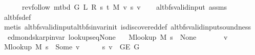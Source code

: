 \begin{isabellebody}
\ \ \ \ \ \ {\isacharparenleft}{\kern0pt}rev{\isacharunderscore}{\kern0pt}follow\ {\isacharparenleft}{\kern0pt}m{\isacharunderscore}{\kern0pt}tbd\ G\ L\ R\ s\ t\ M{\isacharparenright}{\kern0pt}\ v{\isacharparenright}{\kern0pt}\ s\ v{\isachardoublequoteclose}\isanewline
%
\isadelimproof
\ \ %
\endisadelimproof
%
\isatagproof
{}\isamarkupfalse%
\ alt{\isacharunderscore}{\kern0pt}bfs{\isacharunderscore}{\kern0pt}valid{\isacharunderscore}{\kern0pt}input\ assms\isanewline
\ \ \isamarkupfalse%
\ alt{\isacharunderscore}{\kern0pt}bfs{\isacharunderscore}{\kern0pt}def\isanewline
\ \ \isamarkupfalse%
\ {\isacharparenleft}{\kern0pt}metis\ alt{\isacharunderscore}{\kern0pt}bfs{\isacharunderscore}{\kern0pt}valid{\isacharunderscore}{\kern0pt}input{\isachardot}{\kern0pt}alt{\isacharunderscore}{\kern0pt}bfs{\isacharunderscore}{\kern0pt}invar{\isacharunderscore}{\kern0pt}init\ is{\isacharunderscore}{\kern0pt}discovered{\isacharunderscore}{\kern0pt}def\ alt{\isacharunderscore}{\kern0pt}bfs{\isacharunderscore}{\kern0pt}valid{\isacharunderscore}{\kern0pt}input{\isachardot}{\kern0pt}soundness{\isacharparenright}{\kern0pt}%
\endisatagproof
{\isafoldproof}%
%
\isadelimproof
\isanewline
%
\endisadelimproof
%
\isadeliminvisible
\isanewline
%
\endisadeliminvisible
%
\isataginvisible
{}\isamarkupfalse%
\ {\isacharparenleft}{\kern0pt}\ edmonds{\isacharunderscore}{\kern0pt}karp{\isacharunderscore}{\kern0pt}invar{\isacharparenright}{\kern0pt}\ lookup{\isacharunderscore}{\kern0pt}s{\isacharunderscore}{\kern0pt}eq{\isacharunderscore}{\kern0pt}None{\isacharcolon}{\kern0pt}\isanewline
\ \ \ {\isachardoublequoteopen}M{\isacharunderscore}{\kern0pt}lookup\ M\ s\ {\isacharequal}{\kern0pt}\ None{\isachardoublequoteclose}%
\endisataginvisible
{\isafoldinvisible}%
%
\isadeliminvisible
\isanewline
%
\endisadeliminvisible
%
\isadelimproof
%
\endisadelimproof
%
\isatagproof
{}\isamarkupfalse%
\ {\isacharminus}{\kern0pt}\isanewline
\ \ \isacommand{{\isacharbraceleft}{\kern0pt}}\isamarkupfalse%
\ \isamarkupfalse%
\ v\isanewline
\ \ \ \ \isamarkupfalse%
\ {\isachardoublequoteopen}M{\isacharunderscore}{\kern0pt}lookup\ M\ s\ {\isacharequal}{\kern0pt}\ Some\ v{\isachardoublequoteclose}\isanewline
\ \ \ \ \isamarkupfalse%
\ {\isachardoublequoteopen}{\isacharbraceleft}{\kern0pt}s{\isacharcomma}{\kern0pt}\ v{\isacharbraceright}{\kern0pt}\ {\isasymin}\ G{\isachardot}{\kern0pt}E\ G{\isachardoublequoteclose}\isanewline
\ \ \ \ \ \ \isamarkupfalse%

\end{isabellebody}
